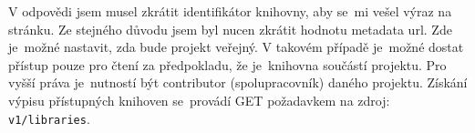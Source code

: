 \par V odpovědi jsem musel zkrátit identifikátor knihovny, aby se~mi vešel výraz na stránku. Ze stejného důvodu jsem byl nucen zkrátit hodnotu metadata url. Zde je~možné nastavit, zda bude projekt veřejný. V takovém případě je~možné dostat přístup pouze pro čtení za předpokladu, že je~knihovna součástí projektu. Pro vyšší práva je~nutností být contributor (spolupracovník) daného projektu. Získání výpisu přístupných knihoven se~provádí GET požadavkem na zdroj: \texttt{v1/libraries}.